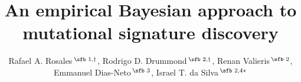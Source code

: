 \documentclass{bioinfo}
\begin{document}
\title[empirical Bayesian NMF]{An empirical Bayesian approach to
  mutational signature discovery}
\author[Rosales, R. A. and Drummond, R. D.~\textit{et~al}.]{
    Rafael A. Rosales\,$^{\text{\sfb 1,}\dagger}$, 
    Rodrigo D. Drummond\,$^{\text{\sfb 2,}\dagger}$, 
    Renan Valieris\,$^{\text{\sfb 2}}$,
    Emmanuel Dias-Neto\,$^{\text{\sfb 3}}$, 
    Israel T. da Silva\,$^{\text{\sfb 2,4}*}$} 
\address{%
   $^{\text{\sf 1}}$Departamento de Computa\c{c}\~ao e
   Matem\'atica, Universidade de S\~ao Paulo, 14040-901 SP, Brazil, 
   $^{\text{\sf 2}}$Laboratory of Bioinformatics and Computational 
   Biology, A. C. Camargo Cancer Center, S\~ao Paulo  01509-010, 
   Brazil, $^{\text{\sf 3}}$Laboratory of Medical Genomics,
   A. C. Camargo Cancer Center, S\~ao Paulo 01509-010, Brazil, 
   $^{\text{\sf 4}}$Laboratory of Molecular Immunology, The
   Rockefeller University, New York, NY 10065, USA\\[1em]
   {\normalsize $^{\dagger}$The authors wish it to be known
   that, in their opinion, the first two authors should be regarded
   as joint First Authors} 
}
\end{document}
